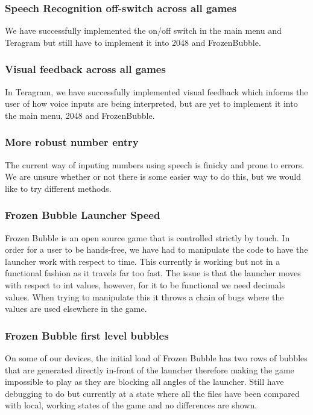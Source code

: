 \documentclass[11pt, oneside]{article}
\begin{document}
\subsubsection*{Speech Recognition off-switch across all games}
We have successfully implemented the on/off switch in the main menu and 
Teragram but still have to implement it into 2048 and FrozenBubble.

\subsubsection*{Visual feedback across all games}
In Teragram, we have successfully implemented visual feedback which
informs the user of how voice inputs are being interpreted, but are
yet to implement it into the main menu, 2048 and FrozenBubble.


\subsubsection*{More robust number entry}
The current way of inputing numbers using speech is finicky and prone to
errors. We are unsure whether or not there is some easier way to do this,
but we would like to try different methods.


\subsubsection*{Frozen Bubble Launcher Speed}
Frozen Bubble is an open source game that is controlled strictly by touch. 
In order for a user to be hands-free, we have had to manipulate the code 
to have the launcher work with respect to time. This currently is working
but not in a functional fashion as it travels far too fast. The issue is 
that the launcher moves with respect to int values, however, for it to be 
functional we need decimals values. When trying to manipulate this it 
throws a chain of bugs where the values are used elsewhere in the game. 


\subsubsection*{Frozen Bubble first level bubbles}
On some of our devices, the initial load of Frozen Bubble has two rows of 
bubbles that are generated directly in-front of the launcher therefore making
the game impossible to play as they are blocking all angles of the launcher. 
Still have debugging to do but currently at a state where all the files have 
been compared with local, working states of the game and no differences are
shown.
\end{document}
